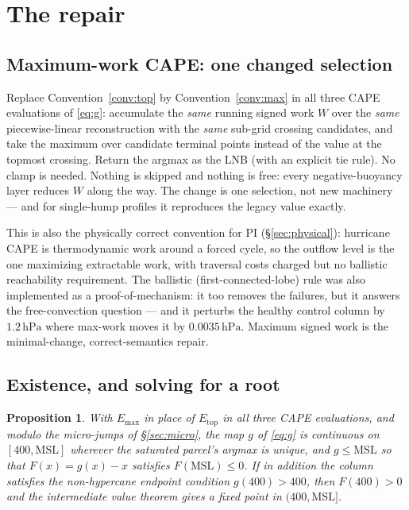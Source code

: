 \documentclass[11pt,a4paper]{article}
\newtheorem{proposition}{Proposition}
\theoremstyle{definition}
\newcommand{\Etop}{E_{\mathrm{top}}}
\newcommand{\Emax}{E_{\mathrm{max}}}
\newcommand{\hPa}{\,\mathrm{hPa}}
\begin{document}
\section{The repair}
\label{sec:fix}

\subsection{Maximum-work CAPE: one changed selection}

Replace Convention~\ref{conv:top} by Convention~\ref{conv:max} in all three
CAPE evaluations of \eqref{eq:g}: accumulate the \emph{same} running signed
work $W$ over the \emph{same} piecewise-linear reconstruction with the
\emph{same} sub-grid crossing candidates, and take the maximum over
candidate terminal points instead of the value at the topmost crossing.
Return the argmax as the LNB (with an explicit tie rule).  No clamp is
needed.  Nothing is skipped and nothing is free: every negative-buoyancy
layer reduces $W$ along the way.  The change is one selection, not new
machinery --- and for single-hump profiles it reproduces the legacy value
exactly.

This is also the physically correct convention for PI
(\S\ref{sec:physical}): hurricane CAPE is thermodynamic work around a
forced cycle, so the outflow level is the one maximizing extractable work,
with traversal costs charged but no ballistic reachability requirement.
The ballistic (first-connected-lobe) rule was also implemented as a
proof-of-mechanism: it too removes the failures, but it answers the
free-convection question ---
and it perturbs the healthy control column by $1.2\hPa$ where max-work
moves it by $0.0035\hPa$.  Maximum signed work is the minimal-change,
correct-semantics repair.

\subsection{Existence, and solving for a root}

\begin{proposition}\label{prop:cont}
With $\Emax$ in place of $\Etop$ in all three CAPE evaluations, and modulo
the micro-jumps of \S\ref{sec:micro}, the map $g$ of \eqref{eq:g} is
continuous on $[400,\mathrm{MSL}]$ wherever the saturated parcel's argmax is
unique, and $g\le\mathrm{MSL}$ so that $F(x)=g(x)-x$ satisfies
$F(\mathrm{MSL})\le0$.  If in addition the column satisfies the
non-hypercane endpoint condition $g(400)>400$, then $F(400)>0$ and the
intermediate value theorem gives a fixed point in $(400,\mathrm{MSL}]$.
\end{proposition}
\end{document}
